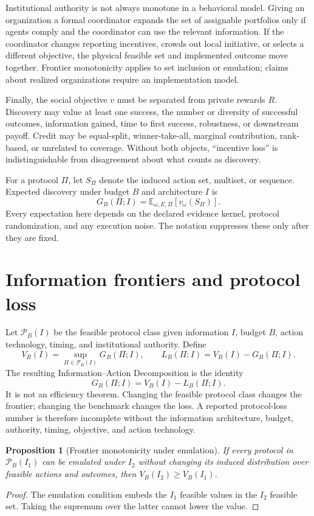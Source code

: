 \documentclass[11pt]{article}
\newtheorem{proposition}{Proposition}
\theoremstyle{remark}
\newcommand{\E}{\mathbb{E}}
\newcommand{\Pclass}{\mathcal{P}}
\begin{document}
Institutional authority is not always monotone in a behavioral model. Giving an organization a formal coordinator expands the set of assignable portfolios only if agents comply and the coordinator can use the relevant information. If the coordinator changes reporting incentives, crowds out local initiative, or selects a different objective, the physical feasible set and implemented outcome move together. Frontier monotonicity applies to set inclusion or emulation; claims about realized organizations require an implementation model.

Finally, the social objective $v$ must be separated from private rewards $R$. Discovery may value at least one success, the number or diversity of successful outcomes, information gained, time to first success, robustness, or downstream payoff. Credit may be equal-split, winner-take-all, marginal contribution, rank-based, or unrelated to coverage. Without both objects, ``incentive loss'' is indistinguishable from disagreement about what counts as discovery.

For a protocol $\Pi$, let $S_\Pi$ denote the induced action set, multiset, or sequence. Expected discovery under budget $B$ and architecture $I$ is
\[
G_B(\Pi;I)=\E_{\omega,E,\Pi}\left[v_\omega(S_\Pi)\right].
\]
Every expectation here depends on the declared evidence kernel, protocol randomization, and any execution noise. The notation suppresses these only after they are fixed.

\section{Information frontiers and protocol loss}
Let $\Pclass_B(I)$ be the feasible protocol class given information $I$, budget $B$, action technology, timing, and institutional authority. Define
\[
V_B(I)=\sup_{\Pi\in\Pclass_B(I)}G_B(\Pi;I),
\qquad
L_B(\Pi;I)=V_B(I)-G_B(\Pi;I).
\]
The resulting Information--Action Decomposition is the identity
\begin{equation}
\boxed{G_B(\Pi;I)=V_B(I)-L_B(\Pi;I).}
\label{eq:decomposition}
\end{equation}
It is not an efficiency theorem. Changing the feasible protocol class changes the frontier; changing the benchmark changes the loss. A reported protocol-loss number is therefore incomplete without the information architecture, budget, authority, timing, objective, and action technology.

\begin{proposition}[Frontier monotonicity under emulation]
If every protocol in $\Pclass_B(I_1)$ can be emulated under $I_2$ without changing its induced distribution over feasible actions and outcomes, then $V_B(I_2)\ge V_B(I_1)$.
\end{proposition}
\begin{proof}
The emulation condition embeds the $I_1$ feasible values in the $I_2$ feasible set. Taking the supremum over the latter cannot lower the value.
\end{proof}
\end{document}
